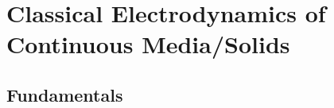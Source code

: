 
%

\chapter{Classical Electrodynamics of Continuous Media/Solids}
\label{ch:classical_electrodynamics}
\section{Fundamentals}
\label{sec:introduction}








